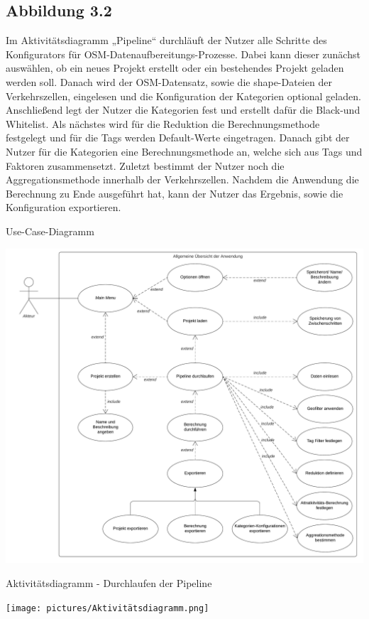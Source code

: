 \documentclass[parskip=full]{scrartcl} %
\begin{document}
\subsection{Abbildung 3.2}
Im Aktivitätsdiagramm „Pipeline“ durchläuft der Nutzer alle Schritte des Konfigurators für OSM-Datenaufbereitungs-Prozesse. Dabei kann dieser zunächst auswählen, ob ein neues Projekt erstellt oder ein bestehendes Projekt geladen werden soll. Danach wird der OSM-Datensatz, sowie die shape-Dateien der Verkehrszellen, eingelesen und die Konfiguration der Kategorien optional geladen. Anschließend legt der Nutzer die Kategorien fest und erstellt dafür die Black-und Whitelist. Als nächstes wird für die Reduktion die Berechnungsmethode festgelegt und für die Tags werden Default-Werte eingetragen. Danach gibt der Nutzer für die Kategorien eine Berechnungsmethode an, welche sich aus Tags und Faktoren zusammensetzt. Zuletzt bestimmt der Nutzer noch die Aggregationsmethode innerhalb der Verkehrszellen. Nachdem die Anwendung die Berechnung zu Ende ausgeführt hat, kann der Nutzer das Ergebnis, sowie die Konfiguration exportieren. 

\begin{center}

\caption{Use-Case-Diagramm}
\includegraphics[width=1\textwidth]{pictures/Anwendungsfalldiagramm.png}

\caption{Aktivitätsdiagramm - Durchlaufen der Pipeline}
\texttt{[image: pictures/Aktivitätsdiagramm.png]}
\end{center}
\end{document}
